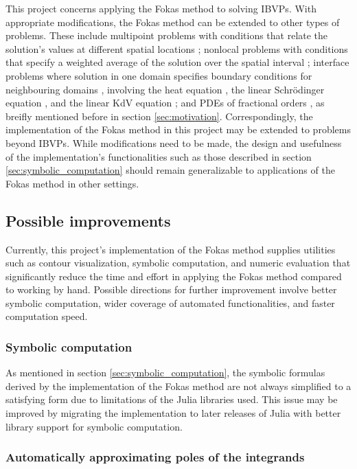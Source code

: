 \documentclass[12pt, oneside, a4paper]{article}
\begin{document}
This project concerns applying the Fokas method to solving IBVPs. With appropriate modifications, the Fokas method can be extended to other types of problems. These include multipoint problems with conditions that relate the solution's values at different spatial locations \cite{Pelloni2018}; nonlocal problems with conditions that specify a weighted average of the solution over the spatial interval \cite{Miller2018}; interface problems where solution in one domain specifies boundary conditions for neighbouring domains \cite{Sheils2015}, involving the heat equation \cite{Sheils2014}\cite{SheilsSmith2015}, the linear Schr\"{o}dinger equation \cite{SheilsDeconinck2014}, and the linear KdV equation \cite{Deconinck2016}; and PDEs of fractional orders \cite{Fernandez2018}, as breifly mentioned before in section \ref{sec:motivation}. Correspondingly, the implementation of the Fokas method in this project may be extended to problems beyond IBVPs. While modifications need to be made, the design and usefulness of the implementation's functionalities such as those described in section \ref{sec:symbolic_computation} should remain generalizable to applications of the Fokas method in other settings.

\subsection{Possible improvements}

Currently, this project's implementation of the Fokas method \cite{Xiao} supplies utilities such as contour visualization, symbolic computation, and numeric evaluation that significantly reduce the time and effort in applying the Fokas method compared to working by hand. Possible directions for further improvement involve better symbolic computation, wider coverage of automated functionalities, and faster computation speed.

\subsubsection{Symbolic computation}

As mentioned in section \ref{sec:symbolic_computation}, the symbolic formulas derived by the implementation of the Fokas method are not always simplified to a satisfying form due to limitations of the Julia libraries used. This issue may be improved by migrating the implementation to later releases of Julia with better library support for symbolic computation.

\subsubsection{Automatically approximating poles of the integrands}
\end{document}
